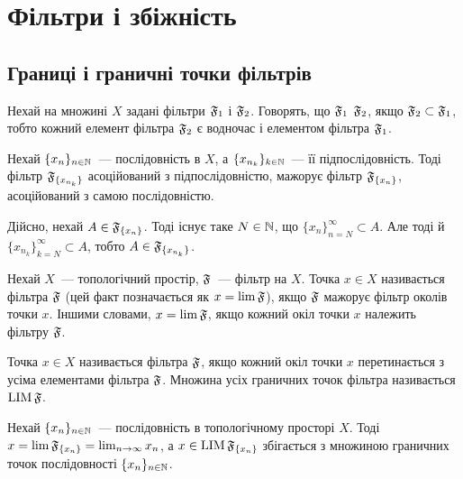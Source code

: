 \chapter{Фільтри і збіжність}

\section{Границі і граничні точки фільтрів}

\begin{definition}
    Нехай на множині $X$ задані фільтри $\frak F_1$ і $\frak F_2$. Говорять, що $\frak F_1$  $\frak F_2$, якщо $\frak F_2 \subset \frak F_1$, тобто кожний елемент фільтра $\frak F_2$ є водночас і елементом фільтра $\frak F_1$.
\end{definition}

\begin{example}
    Нехай $\{x_n\}_{n \in \NN}$~--- послідовність в $X$, а $\{x_{n_k}\}_{k \in \NN}$~--- її підпослідовність. Тоді фільтр $\frak F_{\{x_{n_k}\}}$ асоційований з підпослідовністю, мажорує фільтр $\frak F_{\{x_n\}}$, асоційований з самою послідовністю. 
    
    Дійсно, нехай $A \in \frak F_{\{x_n\}}$. Тоді існує таке $N \in \NN$, що $\{x_n\}_{n = N}^\infty \subset A$. Але тоді й $\{x_{n_k}\}_{k = N}^\infty \subset A$, тобто $A \in \frak F_{\{x_{n_k}\}}$.
\end{example}

\begin{definition}
    Нехай $X$~--- топологічний простір, $\frak F$~--- фільтр на $X$. Точка $x \in X$ називається  фільтра $\frak F$ (цей факт позначається як $x = \lim \frak F$), якщо $\frak F$ мажорує фільтр околів точки $x$. Іншими словами, $x = \lim \frak F$, якщо кожний окіл точки $x$ належить фільтру $\frak F$.
\end{definition}

\begin{definition}
    Точка $x \in X$ називається  фільтра $\frak F$, якщо кожний окіл точки $x$ перетинається з усіма елементами фільтра $\frak F$. Множина усіх граничних точок фільтра називається $\LIM \frak F$.
\end{definition}

\begin{example}
    Нехай $\{x_n\}_{n \in \NN}$~--- послідовність в топологічному просторі $X$. Тоді $x = \lim \frak F_{\{x_n\}} = \lim_{ n \to \infty} x_n$, а $x \in \LIM \frak F_{\{x_n\}}$ збігається з множиною граничних точок послідовності $\{x_n\}_{n \in \NN}$.
\end{example}

